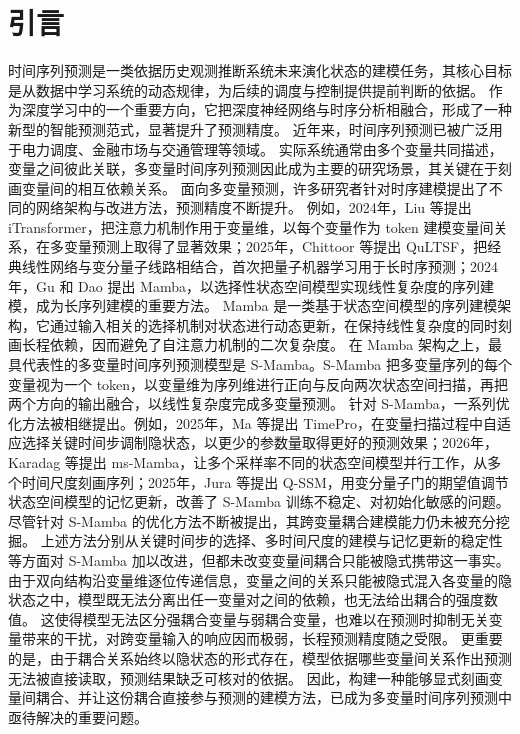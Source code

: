 
\section{引言}

时间序列预测是一类依据历史观测推断系统未来演化状态的建模任务，其核心目标是从数据中学习系统的动态规律，为后续的调度与控制提供提前判断的依据。
作为深度学习中的一个重要方向，它把深度神经网络与时序分析相融合，形成了一种新型的智能预测范式，显著提升了预测精度。
近年来，时间序列预测已被广泛用于电力调度、金融市场与交通管理等领域。
实际系统通常由多个变量共同描述，变量之间彼此关联，多变量时间序列预测因此成为主要的研究场景，其关键在于刻画变量间的相互依赖关系。
面向多变量预测，许多研究者针对时序建模提出了不同的网络架构与改进方法，预测精度不断提升。
例如，2024年，Liu 等提出 iTransformer，把注意力机制作用于变量维，以每个变量作为 token 建模变量间关系，在多变量预测上取得了显著效果\cite{liu2024itransformer}；2025年，Chittoor 等提出 QuLTSF，把经典线性网络与变分量子线路相结合，首次把量子机器学习用于长时序预测\cite{chittoor2025qultsf}；2024年，Gu 和 Dao 提出 Mamba，以选择性状态空间模型实现线性复杂度的序列建模，成为长序列建模的重要方法\cite{gu2024mamba}。
Mamba 是一类基于状态空间模型的序列建模架构，它通过输入相关的选择机制对状态进行动态更新，在保持线性复杂度的同时刻画长程依赖，因而避免了自注意力机制的二次复杂度。
在 Mamba 架构之上，最具代表性的多变量时间序列预测模型是 S-Mamba\cite{wang2025smamba}。S-Mamba 把多变量序列的每个变量视为一个 token，以变量维为序列维进行正向与反向两次状态空间扫描，再把两个方向的输出融合，以线性复杂度完成多变量预测。
针对 S-Mamba，一系列优化方法被相继提出。例如，2025年，Ma 等提出 TimePro，在变量扫描过程中自适应选择关键时间步调制隐状态，以更少的参数量取得更好的预测效果\cite{ma2025timepro}；2026年，Karadag 等提出 ms-Mamba，让多个采样率不同的状态空间模型并行工作，从多个时间尺度刻画序列\cite{karadag2026msmamba}；2025年，Jura 等提出 Q-SSM，用变分量子门的期望值调节状态空间模型的记忆更新，改善了 S-Mamba 训练不稳定、对初始化敏感的问题\cite{jura2025qssm}。
尽管针对 S-Mamba 的优化方法不断被提出，其跨变量耦合建模能力仍未被充分挖掘。
上述方法分别从关键时间步的选择、多时间尺度的建模与记忆更新的稳定性等方面对 S-Mamba 加以改进，但都未改变变量间耦合只能被隐式携带这一事实。
由于双向结构沿变量维逐位传递信息，变量之间的关系只能被隐式混入各变量的隐状态之中，模型既无法分离出任一变量对之间的依赖，也无法给出耦合的强度数值。
这使得模型无法区分强耦合变量与弱耦合变量，也难以在预测时抑制无关变量带来的干扰，对跨变量输入的响应因而极弱，长程预测精度随之受限。
更重要的是，由于耦合关系始终以隐状态的形式存在，模型依据哪些变量间关系作出预测无法被直接读取，预测结果缺乏可核对的依据。
因此，构建一种能够显式刻画变量间耦合、并让这份耦合直接参与预测的建模方法，已成为多变量时间序列预测中亟待解决的重要问题。

